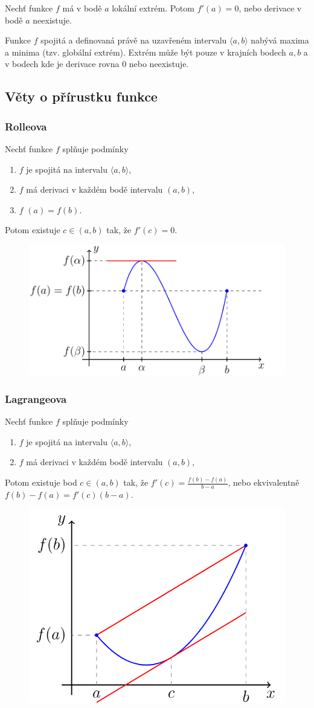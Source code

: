 \documentclass{szzclass}
\begin{document}
Nechť funkce $f$ má v bodě $a$ lokální extrém. Potom $f'(a)=0$,
nebo derivace v bodě $a$ neexistuje.

Funkce $f$ spojitá a definovaná právě na uzavřeném intervalu
$\langle a,b \rangle$ nabývá maxima a minima (tzv. globální extrém).
Extrém může být pouze v krajních bodech $a,b$ a
v bodech kde je derivace rovna $0$ nebo neexistuje.

\newpage

\subsection{Věty o přírustku funkce}
\subsubsection{Rolleova}
Nechť funkce $f$ splňuje podmínky
\begin{enumerate}
    \item $f$ je spojitá na intervalu $\langle a,b \rangle$,
    \item $f$ má derivaci v každém bodě intervalu $(a,b)$,
    \item $f$ $(a)=f(b)$.
\end{enumerate}
Potom existuje $c\in(a,b)$ tak, že $f'(c)=0$.


\begin{figure}[h]
    \includegraphics[width=.6\textwidth, center]{topics/bi-spol-34/images/roll.png}
\end{figure}


\subsubsection{Lagrangeova}
Nechť funkce $f$ splňuje podmínky
\begin{enumerate}
    \item $f$ je spojitá na intervalu $\langle a,b \rangle$,
    \item $f$ má derivaci v každém bodě intervalu $(a,b)$,
\end{enumerate}
Potom existuje bod $c \in (a,b)$ tak, že
$\displaystyle f'(c) = \frac{f(b) - f(a)}{b-a}$,
nebo ekvivalentně $f(b) - f(a) = f'(c) (b-a)$.
\begin{figure}[h]
    \includegraphics[width=.4\textwidth, center]{topics/bi-spol-34/images/lagrange.png}
\end{figure}
\end{document}
